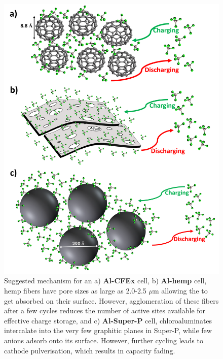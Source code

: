 \newpage
 \begin{figure}[h!]
  \centering
  \includegraphics[width=\textwidth]{Figures/chap5fig/allmech}
    \caption{Suggested mechanism for an a) \textbf{Al-CFEx} cell, b) \textbf{Al-hemp} cell, hemp fibers have pore sizes as large as 2.0-2.5 $\mu$m allowing the  to get absorbed on their surface. However, agglomeration of these fibers after a few cycles reduces the number of active sites available for effective charge storage, and c) \textbf{Al-Super-P} cell, chloroaluminates intercalate into the very few graphitic planes in Super-P, while few anions adsorb onto its surface. However, further cycling leads to cathode pulverisation, which results in capacity fading. }
  \label{Figures/chap5figs:allmech}
\end{figure}

